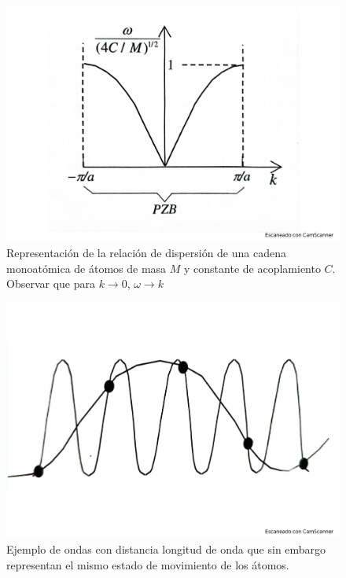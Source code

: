 \begin{figure}[h!] \centering
    \includegraphics[scale=0.45]{Cuerpo/Ch_04/Fotos libro 2.pdf}
    \caption{Representación de la relación de dispersión de una cadena monoatómica de átomos de masa $M$ y constante de acoplamiento $C$. Observar que para $k\rightarrow 0$, $\omega \rightarrow k$}
    \label{Fig:04-02}
\end{figure}    

\begin{figure}[h!] \centering
    \includegraphics[scale=0.45]{Cuerpo/Ch_04/Fotos libro 3.pdf}
    \caption{Ejemplo de ondas con distancia longitud de onda que sin embargo representan el mismo estado de movimiento de los átomos.}
    \label{Fig:04-03}
\end{figure}    

